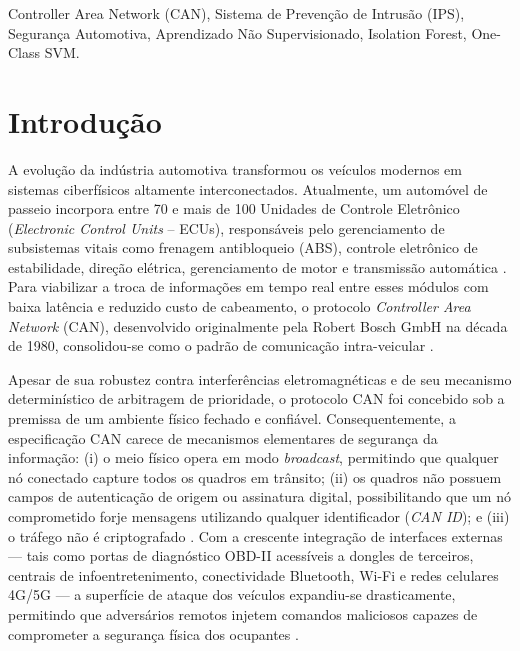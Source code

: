 \documentclass[conference]{IEEEtran}
\begin{document}
\begin{IEEEkeywords}
Controller Area Network (CAN), Sistema de Prevenção de Intrusão (IPS), Segurança Automotiva, Aprendizado Não Supervisionado, Isolation Forest, One-Class SVM.
\end{IEEEkeywords}

\section{Introdução}

A evolução da indústria automotiva transformou os veículos modernos em sistemas ciberfísicos altamente interconectados. Atualmente, um automóvel de passeio incorpora entre 70 e mais de 100 Unidades de Controle Eletrônico (\textit{Electronic Control Units} -- ECUs), responsáveis pelo gerenciamento de subsistemas vitais como frenagem antibloqueio (ABS), controle eletrônico de estabilidade, direção elétrica, gerenciamento de motor e transmissão automática \cite{araujo2021efficient, miller2015remote}. Para viabilizar a troca de informações em tempo real entre esses módulos com baixa latência e reduzido custo de cabeamento, o protocolo \textit{Controller Area Network} (CAN), desenvolvido originalmente pela Robert Bosch GmbH na década de 1980, consolidou-se como o padrão de comunicação intra-veicular \cite{bosch1991can}.

Apesar de sua robustez contra interferências eletromagnéticas e de seu mecanismo determinístico de arbitragem de prioridade, o protocolo CAN foi concebido sob a premissa de um ambiente físico fechado e confiável. Consequentemente, a especificação CAN carece de mecanismos elementares de segurança da informação: (i) o meio físico opera em modo \textit{broadcast}, permitindo que qualquer nó conectado capture todos os quadros em trânsito; (ii) os quadros não possuem campos de autenticação de origem ou assinatura digital, possibilitando que um nó comprometido forje mensagens utilizando qualquer identificador (\textit{CAN ID}); e (iii) o tráfego não é criptografado \cite{koscher2010experimental}. Com a crescente integração de interfaces externas — tais como portas de diagnóstico OBD-II acessíveis a dongles de terceiros, centrais de infoentretenimento, conectividade Bluetooth, Wi-Fi e redes celulares 4G/5G — a superfície de ataque dos veículos expandiu-se drasticamente, permitindo que adversários remotos injetem comandos maliciosos capazes de comprometer a segurança física dos ocupantes \cite{checkoway2011comprehensive, miller2015remote}.
\end{document}
